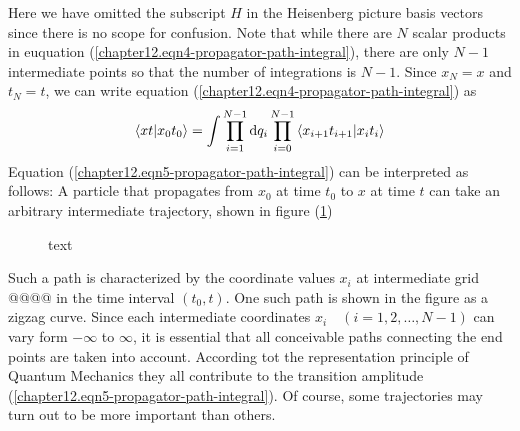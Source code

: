 		Here we have omitted the subscript $H$ in the Heisenberg picture basis vectors since there is no scope for confusion. Note that while there are $N$ scalar products in euquation (\ref{chapter12.eqn4-propagator-path-integral}), there are only $N-1$ intermediate points so that the number of integrations is $N-1$. Since $x_N = x$ and $t_N= t$, we can write equation (\ref{chapter12.eqn4-propagator-path-integral}) as
		\begin{equation}
			\braket{x t}{x_0 t_0} = \int \prod_{i=1}^{N-1} \dd{q_i} \prod_{i=0}^{N-1} \braket{x_{i+1} t_{i+1}}{x_i t_i}
			\label{chapter12.eqn5-propagator-path-integral}
		\end{equation}
		Equation (\ref{chapter12.eqn5-propagator-path-integral}) can be interpreted as follows: A particle that propagates from $x_0$ at time $t_0$ to $x$ at time $t$ can take an arbitrary intermediate trajectory, shown in figure (\ref{chapter12.fig1-propagator-path-integral-trajectory})
		\begin{figure}
			\centering
			\caption{text}
			\label{chapter12.fig1-propagator-path-integral-trajectory}
		\end{figure}
	Such a path is characterized by the coordinate values $x_i$ at intermediate grid @@@@ in the time interval $(t_0,t)$. One such path is shown in the figure as a zigzag curve. Since each intermediate coordinates $x_i\quad (i=1,2,\ldots,N-1)$ can vary form $-\infty$ to $\infty$, it is essential that all conceivable paths connecting the end points are taken into account. According tot the representation principle of Quantum Mechanics they all contribute to the transition amplitude (\ref{chapter12.eqn5-propagator-path-integral}). Of course, some trajectories may turn out to be more important than others.\\
	
